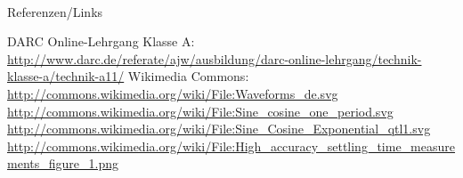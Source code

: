 \renewcommand{\refname}{Referenzen}

\hypertarget{refs}{}
\textcolor{white}{} \\ %
\Large Referenzen/Links
\footnotesize

\begin{thebibliography}{}
      DARC Online-Lehrgang Klasse A:
                    \url{http://www.darc.de/referate/ajw/ausbildung/darc-online-lehrgang/technik-klasse-a/technik-a11/}
        Wikimedia Commons: \\
                    \url{http://commons.wikimedia.org/wiki/File:Waveforms_de.svg}\\
                    \url{http://commons.wikimedia.org/wiki/File:Sine_cosine_one_period.svg}\\
                    \url{http://commons.wikimedia.org/wiki/File:Sine_Cosine_Exponential_qtl1.svg}\\
                    \url{http://commons.wikimedia.org/wiki/File:High_accuracy_settling_time_measurements_figure_1.png}
\end{thebibliography} 


